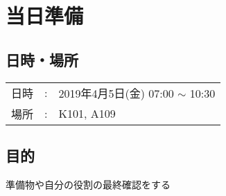 
%
\section{当日準備}


\subsection{日時・場所}
\begin{tabular}{p{}rp{}}
  日時 & : & 2019年4月5日(金) 07:00 $\sim$ 10:30\\ %
  場所 & : & K101, A109                                        %
\end{tabular}

\vspace{-5mm}
\subsection{目的}
準備物や自分の役割の最終確認をする

\vspace{-5mm}

